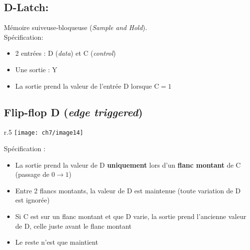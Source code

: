 \subsection{D-Latch:} Mémoire suiveuse-bloqueuse (\textit{Sample and Hold}).\\
Spécification:
\begin{itemize}
	\item 2 entrées : D (\textit{data}) et C (\textit{control})
	\item Une sortie : Y
	\item La sortie prend la valeur de l'entrée D lorsque C$=1$
\end{itemize}
\subsection{Flip-flop D (\textit{edge triggered})}
\label{subsec:Dflipflop}
\begin{wrapfigure}{r}{.5\textwidth}
	\centering
	\texttt{[image: ch7/image14]}
\end{wrapfigure}
Spécification :
\begin{itemize}
	\item La sortie prend la valeur de D \textbf{uniquement} lors d'un \textbf{flanc montant} de C (passage de $0\rightarrow 1$)
	\item Entre 2 flancs montants, la valeur de D est maintenue (toute variation de D est ignorée)
	\item Si C est sur un flanc montant et que D varie, la sortie prend l'ancienne valeur de D, celle juste avant le flanc montant 
	\item Le reste n'est que maintient
\end{itemize}
